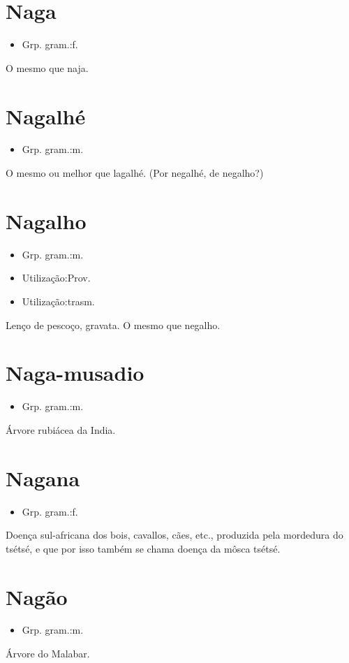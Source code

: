 \section{Naga}
\begin{itemize}
\item {Grp. gram.:f.}
\end{itemize}
O mesmo que \textunderscore naja\textunderscore .
\section{Nagalhé}
\begin{itemize}
\item {Grp. gram.:m.}
\end{itemize}
O mesmo ou melhor que \textunderscore lagalhé\textunderscore .
(Por \textunderscore negalhé\textunderscore , de \textunderscore negalho\textunderscore ?)
\section{Nagalho}
\begin{itemize}
\item {Grp. gram.:m.}
\end{itemize}
\begin{itemize}
\item {Utilização:Prov.}
\end{itemize}
\begin{itemize}
\item {Utilização:trasm.}
\end{itemize}
Lenço de pescoço, gravata.
O mesmo que \textunderscore negalho\textunderscore .
\section{Naga-musadio}
\begin{itemize}
\item {Grp. gram.:m.}
\end{itemize}
Árvore rubiácea da India.
\section{Nagana}
\begin{itemize}
\item {Grp. gram.:f.}
\end{itemize}
Doença sul-africana dos bois, cavallos, cães, etc., produzida pela mordedura do tsétsé, e que por isso também se chama \textunderscore doença da môsca tsétsé\textunderscore .
\section{Nagão}
\begin{itemize}
\item {Grp. gram.:m.}
\end{itemize}
Árvore do Malabar.
